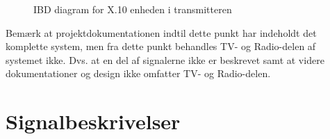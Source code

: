 \begin{figure}[h]
	\centering {}
	\caption{IBD diagram for X.10 enheden i transmitteren}
	\label{fig:IDBx.10lys}
\end{figure}

\clearpage

Bemærk at projektdokumentationen indtil dette punkt har indeholdt det komplette system, men fra dette punkt behandles TV- og Radio-delen af systemet ikke. Dvs. at en del af signalerne ikke er beskrevet samt at videre dokumentationer og design ikke omfatter TV- og Radio-delen.

\section{Signalbeskrivelser}
